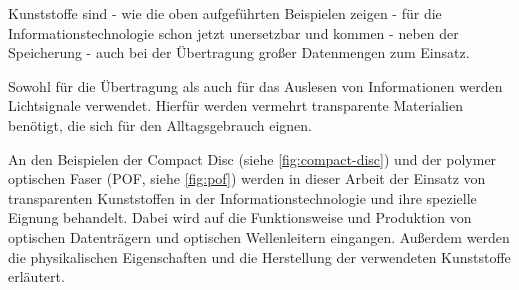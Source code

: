 Kunststoffe sind - wie die oben aufgeführten Beispielen zeigen - für die
Informationstechnologie schon jetzt unersetzbar und kommen - neben der
Speicherung - auch bei der Übertragung großer Datenmengen zum Einsatz.

Sowohl für die Übertragung als auch für das Auslesen von Informationen werden
Lichtsignale verwendet. Hierfür werden vermehrt transparente Materialien
benötigt, die sich für den Alltagsgebrauch eignen.

An den Beispielen der Compact Disc (siehe \autoref{fig:compact-disc}) und der
polymer optischen Faser (POF,  siehe \autoref{fig:pof}) werden in dieser Arbeit
der Einsatz von transparenten Kunststoffen in der Informationstechnologie und
ihre spezielle Eignung behandelt. Dabei wird auf die Funktionsweise und
Produktion von optischen Datenträgern und optischen Wellenleitern eingangen.
Außerdem werden die physikalischen Eigenschaften und die Herstellung der
verwendeten Kunststoffe erläutert.


